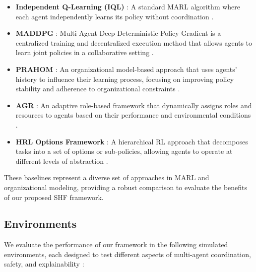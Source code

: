 \documentclass[sigconf,anonymous]{aamas}
\begin{document}
\begin{itemize}
    \item \textbf{Independent Q-Learning (IQL)} \cite{iql_reference}: A standard MARL algorithm where each agent independently learns its policy without coordination \cite{foerster2016learning}.
    \item \textbf{MADDPG} \cite{maddpg_reference}: Multi-Agent Deep Deterministic Policy Gradient is a centralized training and decentralized execution method that allows agents to learn joint policies in a collaborative setting \cite{lowe2017multi}.
    \item \textbf{PRAHOM} \cite{prahom_reference}: An organizational model-based approach that uses agents' history to influence their learning process, focusing on improving policy stability and adherence to organizational constraints \cite{hubner2010moise}.
    \item \textbf{AGR} \cite{agr_reference}: An adaptive role-based framework that dynamically assigns roles and resources to agents based on their performance and environmental conditions \cite{hernandez2019survey}.
    \item \textbf{HRL Options Framework} \cite{options_hrl_reference}: A hierarchical RL approach that decomposes tasks into a set of options or sub-policies, allowing agents to operate at different levels of abstraction \cite{foerster2018counterfactual}.
\end{itemize}


These baselines represent a diverse set of approaches in MARL and organizational modeling, providing a robust comparison to evaluate the benefits of our proposed SHF framework.

\subsection{Environments}
We evaluate the performance of our framework in the following simulated environments, each designed to test different aspects of multi-agent coordination, safety, and explainability \cite{foerster2016learning, soule2024}:
\end{document}

